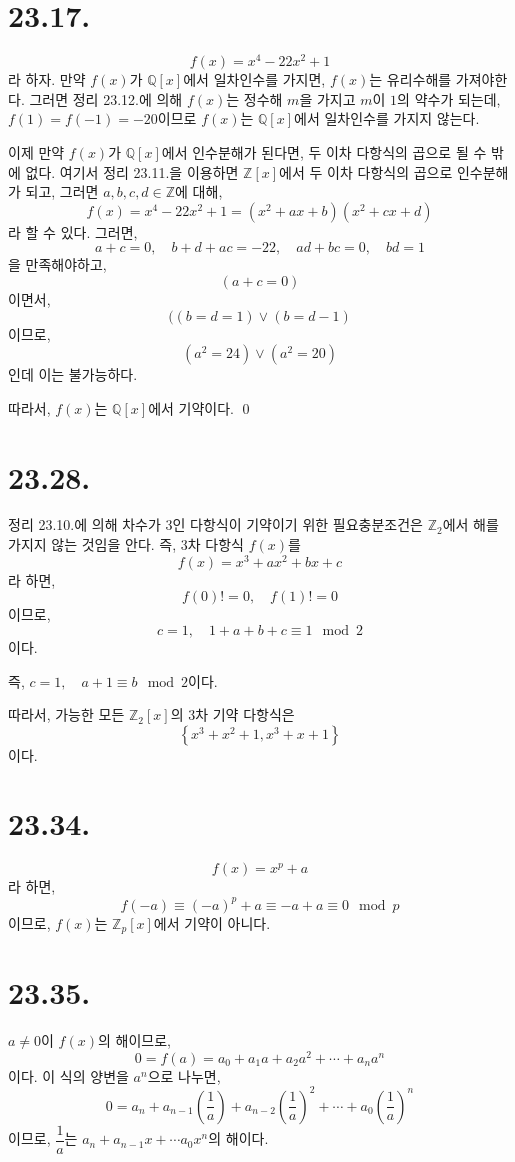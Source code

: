 \documentclass{article}
\begin{document}
\section{23.17.}
$$f(x) = x^4 - 22 x^2 + 1$$
라 하자. 만약 $f(x)$가 $\mathbb{Q}[x]$에서 일차인수를 가지면, $f(x)$는 유리수해를 가져야한다. 그러면 정리 23.12.에 의해 $f(x)$는 정수해 $m$을 가지고 $m$이 $1$의 약수가 되는데, $f(1) = f(-1) = -20$이므로 $f(x)$는 $\mathbb{Q}[x]$에서 일차인수를 가지지 않는다.

이제 만약 $f(x)$가 $\mathbb{Q}[x]$에서 인수분해가 된다면, 두 이차 다항식의 곱으로 될 수 밖에 없다. 여기서 정리 23.11.을 이용하면 $\mathbb{Z}[x]$에서 두 이차 다항식의 곱으로 인수분해가 되고, 그러면 $a, b, c, d \in \mathbb{Z}$에 대해,
$$f(x) = x^4 - 22 x^2 + 1 = (x^2+ax+b)(x^2+cx+d)$$
라 할 수 있다. 그러면,
$$a+c = 0, \quad b + d + ac = -22, \quad ad + bc = 0, \quad bd = 1$$
을 만족해야하고, 
$$(a + c = 0)$$이면서, $$( (b = d = 1) \vee (b = d - 1) $$이므로,
$$(a^2 = 24) \vee (a^2 = 20)$$인데 이는 불가능하다.

따라서, $f(x)$는 $\mathbb{Q}[x]$에서 기약이다. \qed

\section{23.28.}
정리 23.10.에 의해 차수가 3인 다항식이 기약이기 위한 필요충분조건은 $\mathbb{Z}_2$에서 해를 가지지 않는 것임을 안다. 즉, 3차 다항식 $f(x)$를
$$f(x) = x^3 + ax^2 + bx + c$$
라 하면, $$f(0) != 0, \quad f(1) != 0$$이므로,
$$c = 1, \quad 1 + a + b + c \equiv 1 \mod 2$$이다.

즉, $c = 1, \quad a + 1\equiv b \mod 2$이다.

따라서, 가능한 모든 $\mathbb{Z}_2[x]$의 3차 기약 다항식은
$$\left\{x^3+x^2+1, x^3+x+1\right\}$$
이다.
\section{23.34.}
$$f(x) = x^p + a$$라 하면,
$$f(-a) \equiv (-a)^p + a \equiv -a + a \equiv 0 \mod p$$이므로,
$f(x)$는 $\mathbb{Z}_p[x]$에서 기약이 아니다.

\section{23.35.}
$a \neq 0$이 $f(x)$의 해이므로,
$$0 = f(a) = a_0 + a_1 a + a_2 a^2 + \cdots + a_n a^n$$이다. 이 식의 양변을 $a^n$으로 나누면,
$$0 = a_n + a_{n-1}(\frac{1}{a}) + a_{n-2}(\frac{1}{a})^2 + \cdots + a_0(\frac{1}{a})^n$$이므로, $\dfrac{1}{a}$는 $a_n + a_{n-1} x + \cdots a_0 x^n$의 해이다.
\end{document}
